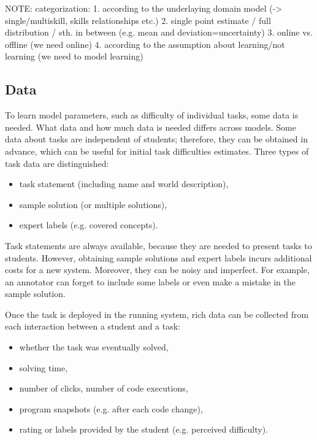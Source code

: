 NOTE: categorization:
1. according to the underlaying domain model (-> single/multiskill, skills relationships etc.)
2. single point estimate / full distribution / sth. in between (e.g. mean and deviation=uncertainty)
3. online vs. offline (we need online)
4. according to the assumption about learning/not learning (we need to model learning)


\subsection{Data}
\label{sec:student-modeling.data}

To learn model parameters, such as difficulty of individual tasks, some data is needed.
What data and how much data is needed differs across models.
Some data about tasks are independent of students;
therefore, they can be obtained in advance,
which can be useful for initial task difficulties estimates.
Three types of task data are distinguished:

\begin{itemize}
  \item task statement (including name and world description),
  \item sample solution (or multiple solutions),
  \item expert labels (e.g. covered concepts).
\end{itemize}

Task statements are always available,
  because they are needed to present tasks to students.
However, obtaining sample solutions and expert labels
  incurs additional costs for a new system.
Moreover, they can be noisy and imperfect.
For example, an annotator can forget to include some labels
  or even make a mistake in the sample solution.

Once the task is deployed in the running system,
  rich data can be collected from each interaction between a student and a task:
\begin{itemize}
  \item whether the task was eventually solved,
  \item solving time,
  \item number of clicks, number of code executions,
  \item program snapshots (e.g. after each code change),
  \item rating or labels provided by the student (e.g. perceived difficulty).
\end{itemize}


